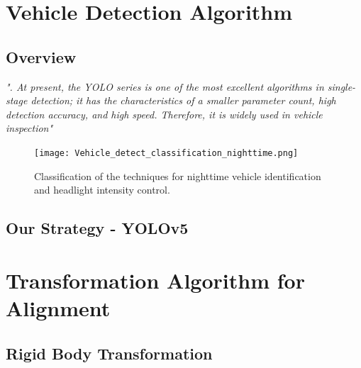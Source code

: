 \newpage

\section{Vehicle Detection Algorithm}

\subsection{Overview}
\textit{". At present, the YOLO series is one of the most excellent algorithms in single-stage detection; it has the characteristics of a smaller parameter count, high detection accuracy, and high speed. Therefore, it is widely used in vehicle inspection"} \cite{Yolov5_Improvement}

\begin{figure}[h!]
    \centering
    \texttt{[image: Vehicle\_detect\_classification\_nighttime.png]}
    \caption{Classification of the techniques for nighttime vehicle identification and headlight intensity control. \cite{night_vehicle_detec}}
    \label{fig:enter-label}
\end{figure}


\subsection{Our Strategy - YOLOv5}



\newpage
\section{Transformation Algorithm for Alignment}

\subsection{Rigid Body Transformation}
